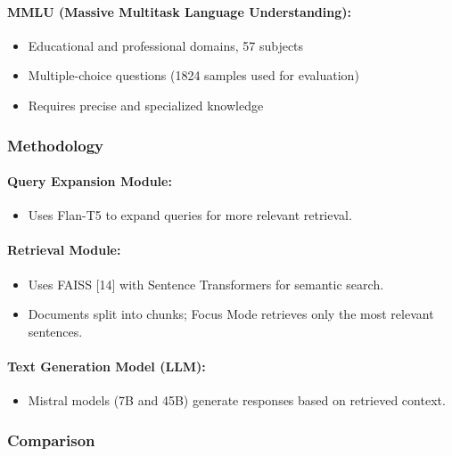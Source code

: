 \documentclass[12pt, a4paper, oneside]{report}
\begin{document}
\paragraph{MMLU (Massive Multitask Language Understanding):}
\begin{itemize}[noitemsep]
  \item Educational and professional domains, 57 subjects
  \item Multiple-choice questions (1824 samples used for evaluation)
  \item Requires precise and specialized knowledge
\end{itemize}

\newpage
\subsubsection{Methodology}

\paragraph{Query Expansion Module:}
\begin{itemize}[noitemsep]
  \item Uses Flan-T5 to expand queries for more relevant retrieval.
\end{itemize}

\paragraph{Retrieval Module:}
\begin{itemize}[noitemsep]
  \item Uses FAISS [14] with Sentence Transformers for semantic search.
  \item Documents split into chunks; Focus Mode retrieves only the most relevant sentences.
\end{itemize}

\paragraph{Text Generation Model (LLM):}
\begin{itemize}[noitemsep]
  \item Mistral models (7B and 45B) generate responses based on retrieved context.
\end{itemize}

\subsubsection{Comparison}
\end{document}

